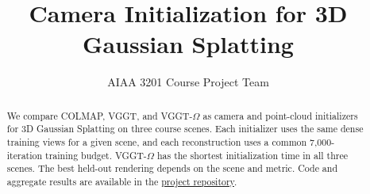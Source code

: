 \documentclass[10pt,twocolumn,letterpaper]{article}
\title{Camera Initialization for 3D Gaussian Splatting}
\author{AIAA 3201 Course Project Team}
\begin{document}
\maketitle

\begin{abstract}
We compare COLMAP, VGGT, and VGGT-$\Omega$ as camera and point-cloud initializers for 3D Gaussian Splatting on three course scenes. Each initializer uses the same dense training views for a given scene, and each reconstruction uses a common 7,000-iteration training budget. VGGT-$\Omega$ has the shortest initialization time in all three scenes. The best held-out rendering depends on the scene and metric. Code and aggregate results are available in the \href{https://github.com/MoliaiELS/CV_Project4}{project repository}.
\end{abstract}




\end{document}
